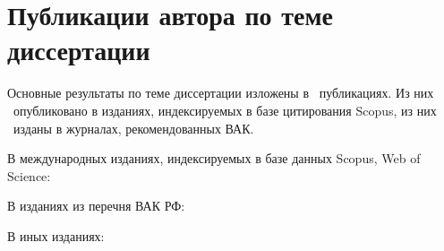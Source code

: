 \section*{Публикации автора по теме диссертации}

Основные результаты по теме диссертации изложены в \theAllMyPapers~публикациях. 
Из них \theScopusPapers~опубликовано в изданиях, индексируемых в базе цитирования Scopus, 
из них \theVakPapers~изданы в журналах, рекомендованных ВАК. 
%

В международных изданиях, индексируемых в базе данных Scopus, Web of Science:
\printPapperScopus

В изданиях из перечня ВАК РФ:

В иных изданиях:
\printPapperOther
